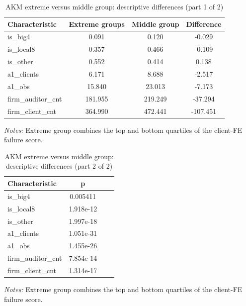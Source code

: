 \begin{table}[htbp]
\footnotesize
\centering
\caption{AKM extreme versus middle group: descriptive differences (part 1 of 2)}
\begin{threeparttable}
\begin{tabular}{p{}ccc}
\toprule
Characteristic & Extreme groups & Middle group & Difference \\
\midrule
is\_big4 & 0.091 & 0.120 & -0.029 \\
is\_local8 & 0.357 & 0.466 & -0.109 \\
is\_other & 0.552 & 0.414 & 0.138 \\
a1\_clients & 6.171 & 8.688 & -2.517 \\
a1\_obs & 15.840 & 23.013 & -7.173 \\
firm\_auditor\_cnt & 181.955 & 219.249 & -37.294 \\
firm\_client\_cnt & 364.990 & 472.441 & -107.451 \\
\bottomrule
\end{tabular}
\begin{tablenotes}\footnotesize
\item \raggedright \textit{Notes:} Extreme group combines the top and bottom quartiles of the client-FE failure score.
\end{tablenotes}
\end{threeparttable}
\end{table}

\begin{table}[htbp]
\footnotesize
\centering
\caption{AKM extreme versus middle group: descriptive differences (part 2 of 2)}
\begin{threeparttable}
\begin{tabular}{p{}ccc}
\toprule
Characteristic & p &  &  \\
\midrule
is\_big4 & 0.005411 &  &  \\
is\_local8 & 1.918e-12 &  &  \\
is\_other & 1.997e-18 &  &  \\
a1\_clients & 1.051e-31 &  &  \\
a1\_obs & 1.455e-26 &  &  \\
firm\_auditor\_cnt & 7.854e-14 &  &  \\
firm\_client\_cnt & 1.314e-17 &  &  \\
\bottomrule
\end{tabular}
\begin{tablenotes}\footnotesize
\item \raggedright \textit{Notes:} Extreme group combines the top and bottom quartiles of the client-FE failure score.
\end{tablenotes}
\end{threeparttable}
\end{table}
